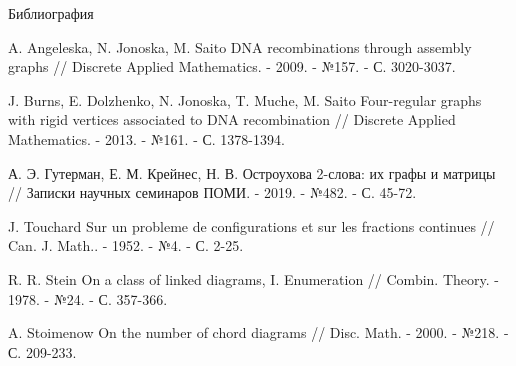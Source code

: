 \documentclass[14pt, aspectratio=169, notheorems]{beamer}
\theoremstyle{plain}
\theoremstyle{definition}
\theoremstyle{remark}
\begin{document}
\begin{frame}[allowframebreaks]{Библиография}
    \begin{thebibliography}{00}
	A. Angeleska, N. Jonoska, M. Saito DNA recombinations through assembly graphs // Discrete Applied Mathematics. - 2009. - №157. - С. 3020-3037.

	J. Burns, E. Dolzhenko, N. Jonoska, T. Muche, M. Saito Four-regular graphs with rigid vertices associated to DNA recombination // Discrete Applied Mathematics. - 2013. - №161. - С. 1378-1394.

    А. Э. Гутерман, Е. М. Крейнес, Н. В. Остроухова 2-слова: их графы и матрицы // Записки научных семинаров ПОМИ. - 2019. - №482. - С. 45-72.

    J. Touchard Sur un probleme de configurations et sur les fractions continues // Can. J. Math.. - 1952. - №4. - С. 2-25.
    
    R. R. Stein On a class of linked diagrams, I. Enumeration // Combin. Theory. - 1978. - №24. - С. 357-366.

    A. Stoimenow On the number of chord diagrams // Disc. Math. - 2000. - №218. - С. 209-233.
    
    \end{thebibliography}
\end{frame}
\end{document}
